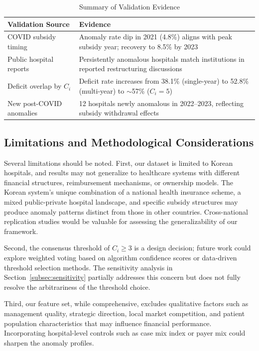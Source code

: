 \documentclass{ieeeaccess}
\begin{document}
\begin{table}[!t]
\centering
\caption{Summary of Validation Evidence}
\label{tab:validation_summary}
\begin{tabular}{@{}p{2.4cm}p{5.2cm}@{}}
\toprule
\textbf{Validation Source} & \textbf{Evidence} \\
\midrule
COVID subsidy timing & Anomaly rate dip in 2021 (4.8\%) aligns with peak subsidy year; recovery to 8.5\% by 2023 \\
Public hospital reports & Persistently anomalous hospitals match institutions in reported restructuring discussions \\
Deficit overlap by $C_i$ & Deficit rate increases from 38.1\% (single-year) to 52.8\% (multi-year) to $\sim$57\% ($C_i=5$) \\
New post-COVID anomalies & 12 hospitals newly anomalous in 2022--2023, reflecting subsidy withdrawal effects \\
\bottomrule
\end{tabular}
\end{table}

\subsection{Limitations and Methodological Considerations}
\label{subsec:limitations}

Several limitations should be noted. First, our dataset is limited to Korean hospitals, and results may not generalize to healthcare systems with different financial structures, reimbursement mechanisms, or ownership models. The Korean system's unique combination of a national health insurance scheme, a mixed public-private hospital landscape, and specific subsidy structures may produce anomaly patterns distinct from those in other countries. Cross-national replication studies would be valuable for assessing the generalizability of our framework.

Second, the consensus threshold of $C_i \geq 3$ is a design decision; future work could explore weighted voting based on algorithm confidence scores or data-driven threshold selection methods. The sensitivity analysis in Section~\ref{subsec:sensitivity} partially addresses this concern but does not fully resolve the arbitrariness of the threshold choice.

Third, our feature set, while comprehensive, excludes qualitative factors such as management quality, strategic direction, local market competition, and patient population characteristics that may influence financial performance. Incorporating hospital-level controls such as case mix index or payer mix could sharpen the anomaly profiles.
\end{document}
